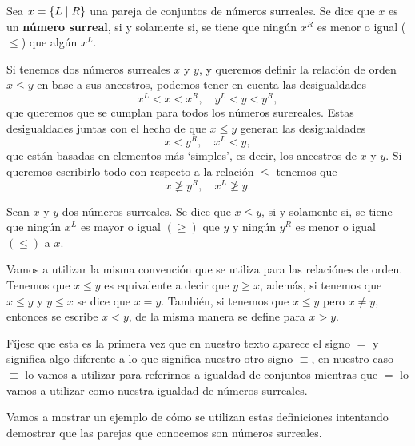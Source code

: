     \begin{definition}
        Sea $x=\left\{L\mid R\right\}$ una pareja de conjuntos de n\'umeros surreales. Se dice que $x$ es un \textbf{n\'umero surreal}, si y solamente si, se tiene que ningún $x^R$ es menor o igual ($\le$) que algún $x^L$. 
    \end{definition}

    Si tenemos dos n\'umeros surreales $x$ y $y$, y queremos definir la relaci\'on de orden $x\le y$ en base a sus ancestros, podemos tener en cuenta las desigualdades
    \[
        x^L < x < x^R,\quad y^L < y < y^R,
    \]
    que queremos que se cumplan para todos los n\'umeros surereales. Estas desigualdades juntas con el hecho de que $x\le y$ generan las desigualdades
    \[
        x < y^R,\quad x^L < y,
    \]
    que est\'an basadas en elementos m\'as `simples', es decir, los ancestros de $x$ y $y$. Si queremos escribirlo todo con respecto a la relaci\'on $\le$ tenemos que
    \[
        x \not\ge y^R,\quad x^L \not\ge y.
    \]

    \begin{definition}
        Sean $x$ y $y$ dos n\'umeros surreales. Se dice que $x\le y$, si y solamente si, se tiene que ning\'un $x^L$ es mayor o igual $(\ge)$ que $y$ y ningún $y^R$ es menor o igual $(\le)$ a $x$.
    \end{definition}

    Vamos a utilizar la misma convenci\'on que se utiliza para las relaci\'ones de orden. Tenemos que $x\le y$ es equivalente a decir que $y\ge x$, adem\'as, si tenemos que $x\le y$ y $y\le x$ se dice que $x=y$. Tambi\'en, si tenemos que $x\le y$ pero $x \not= y$, entonces se escribe $x < y$, de la misma manera se define para $x > y$.

    F\'ijese que esta es la primera vez que en nuestro texto aparece el signo $=$ y significa algo diferente a lo que significa nuestro otro signo $\equiv$, en nuestro caso $\equiv$ lo vamos a utilizar para referirnos a igualdad de conjuntos mientras que $=$ lo vamos a utilizar como nuestra igualdad de n\'umeros surreales.

    Vamos a mostrar un ejemplo de c\'omo se utilizan estas definiciones intentando demostrar que las parejas que conocemos son n\'umeros surreales.

